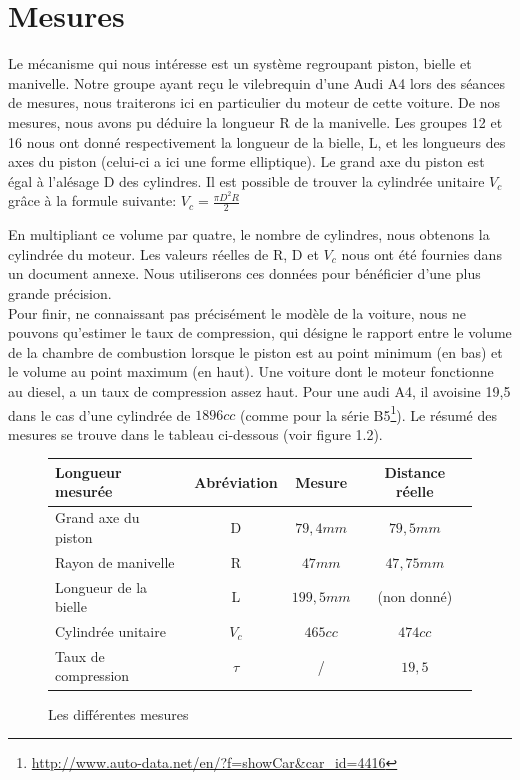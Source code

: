 \documentclass[a4paper,oneside,11pt]{report}
\begin{document}

\section{Mesures}

Le mécanisme qui nous intéresse est un système regroupant piston, bielle et manivelle. Notre groupe ayant reçu le vilebrequin d'une Audi A4 lors des séances de mesures, nous traiterons ici en particulier du moteur de cette voiture. De nos mesures, nous avons pu déduire la longueur R de la manivelle. Les groupes 12 et 16 nous ont donné respectivement la longueur de la bielle, L, et les longueurs des axes du piston (celui-ci a ici une forme elliptique). Le grand axe du piston est égal à l'alésage D des cylindres. Il est possible de trouver la cylindrée unitaire $V_c$ grâce à la formule suivante: 
$V_c =\frac{\pi D^2 R}{2}$

En multipliant ce volume par quatre, le nombre de cylindres, nous obtenons la cylindrée du moteur. Les valeurs réelles de R, D et $V_c$ nous ont été fournies dans un document annexe. Nous utiliserons ces données pour bénéficier d'une plus grande précision.\\

Pour finir, ne connaissant pas précisément le modèle de la voiture, nous ne pouvons qu'estimer le taux de compression, qui désigne le rapport entre le volume de la chambre de combustion lorsque le piston est au point minimum (en bas) et le volume au point maximum (en haut). Une voiture dont le moteur fonctionne au diesel, a un taux de compression assez haut. Pour une audi A4, il avoisine 19,5 dans le cas d'une cylindrée de $1896cc$ (comme pour la série
B5\footnote{\url{http://www.auto-data.net/en/?f=showCar&car_id=4416}}). Le résumé des mesures se trouve dans le tableau ci-dessous (voir figure 1.2).

\begin{figure}[h]
\centering
\begin{tabular}{|l|c|c|c|}
  \hline
  Longueur mesurée & Abréviation & Mesure & Distance réelle\\
  \hline
  Grand axe du piston & D & $79,4mm$ & $79,5mm$ \\
  Rayon de manivelle & R & $47mm$ & $47,75mm$\\
  Longueur de la bielle & L & $199,5mm$ & (non donné)\\
  Cylindrée unitaire & $V_c$  & $465cc$ & $474cc$\\
  Taux de compression & $\tau$ & / & $19,5$\\
  \hline
\end{tabular}
\caption{Les différentes mesures}
\end{figure}
\end{document}
